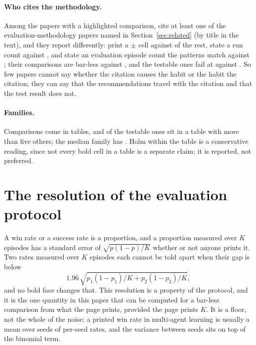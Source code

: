 \documentclass[sigconf,anonymous]{aamas}
\begin{document}
\paragraph{Who cites the methodology.} Among the \nCcDetectedIn{} papers
with a highlighted comparison, \nCcCitingPapers{} cite at least one of the
evaluation-methodology papers named in Section~\ref{sec:related} (by title
in the text), and they report differently: \nCcCitingPm{} print a $\pm$
cell against \nCcNotCitingPm{} of the rest, \nCcCitingRuns{} state a run
count against \nCcNotCitingRuns{}, and \nCcCitingK{} state an evaluation
episode count the patterns match against \nCcNotCitingK{}; their
comparisons are \nCcCitingNeither{} bar-less against
\nCcNotCitingNeither{}, and the \nCcCitingNTestable{} testable ones fail
at \nCcCitingFail{} against \nCcNotCitingFail{}. So few papers cannot say
whether the citation causes the habit or the habit the citation; they can
say that the recommendations travel with the citation and that the test
result does not.

\paragraph{Families.} Comparisons come in tables, and
\nHolmPctInFamiliesOverFive{} of the testable ones sit in a table with more
than five others; the median family has \nHolmMedianFamily{}. Holm within
the table is a conservative reading, since not every bold cell in a table is
a separate claim; it is reported, not preferred.

\section{The resolution of the evaluation protocol}
\label{sec:protocol}

A win rate or a success rate is a proportion, and a proportion measured over
$K$ episodes has a standard error of $\sqrt{p(1-p)/K}$ whether or not anyone
prints it. Two rates measured over $K$ episodes each cannot be told apart
when their gap is below
\begin{equation*}
1.96\,\sqrt{p_1(1-p_1)/K + p_2(1-p_2)/K},
\end{equation*}
and no bold face changes that. This resolution is a property of the
protocol, and it is the one quantity in this paper that can be computed for
a bar-less comparison from what the page prints, provided the page prints
$K$. It is a floor, not the whole of the noise: a printed win rate in
multi-agent learning is usually a mean over seeds of per-seed rates, and the
variance between seeds sits on top of the binomial term.
\end{document}
